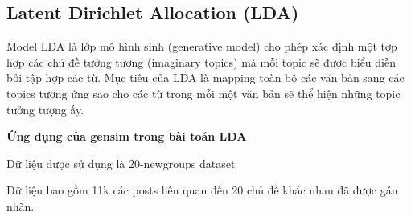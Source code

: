 \subsection{Latent Dirichlet Allocation (LDA)}
Model LDA là lớp mô hình sinh (generative model) cho phép xác định một tợp hợp các chủ đề tưởng tượng (imaginary topics) mà mỗi topic sẽ được biểu diễn bởi tập hợp các từ. Mục tiêu của LDA là mapping toàn bộ các văn bản sang các topics tương ứng sao cho các từ trong mỗi một văn bản sẽ thể hiện những topic tưởng tượng ấy.

\textbf{Ứng dụng của gensim trong bài toán LDA} \cite{WEBSITE:14}

Dữ liệu được sử dụng là 20-newgroups dataset

Dữ liệu bao gồm 11k các posts liên quan đến 20 chủ đề khác nhau đã được gán nhãn.

